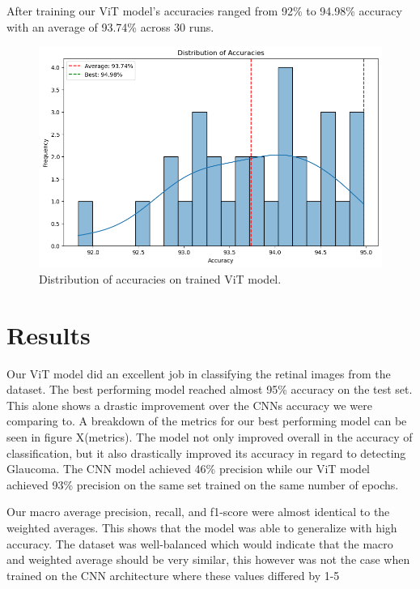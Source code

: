 \documentclass[sigconf]{acmart}
\begin{document}
After training our ViT model’s accuracies ranged from 92\% to 94.98\% accuracy with an average of 93.74\% across 30 runs.
\begin{figure}[h]
  \centering
  \includegraphics[width=\linewidth]{samples/resources/Accuracy distribution.png}
  \caption{Distribution of accuracies on trained ViT model.}
\end{figure}


\section{Results}
Our ViT model did an excellent job in classifying the retinal images from the dataset. The best performing model reached almost 95\% accuracy on the test set. This alone shows a drastic improvement over the CNNs accuracy we were comparing to. A breakdown of the metrics for our best performing model can be seen in figure X(metrics). The model not only improved overall in the accuracy of classification, but it also drastically improved its accuracy in regard to detecting Glaucoma. The CNN model achieved 46\% precision while our ViT model achieved 93\% precision on the same set trained on the same number of epochs. 


Our macro average precision, recall, and f1-score were almost identical to the weighted averages. This shows that the model was able to generalize with high accuracy. The dataset was well-balanced which would indicate that the macro and weighted average should be very similar, this however was not the case when trained on the CNN architecture where these values differed by 1-5%
\end{document}
